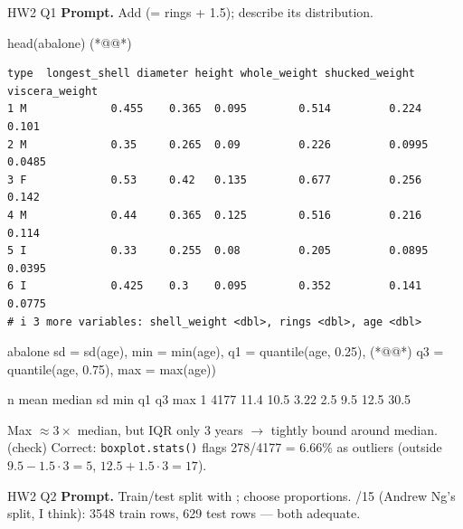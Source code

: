 \begin{qbox}{HW2 Q1}
\textbf{Prompt.} Add  (= rings + 1.5); describe its distribution.
\mine
\begin{rcode}
head(abalone)  (*@@*)
\end{rcode}
\begin{lstlisting}[style=cs/rout,basicstyle=\ttfamily\scriptsize]
  type  longest_shell diameter height whole_weight shucked_weight viscera_weight
1 M             0.455    0.365  0.095        0.514         0.224          0.101
2 M             0.35     0.265  0.09         0.226         0.0995         0.0485
3 F             0.53     0.42   0.135        0.677         0.256          0.142
4 M             0.44     0.365  0.125        0.516         0.216          0.114
5 I             0.33     0.255  0.08         0.205         0.0895         0.0395
6 I             0.425    0.3    0.095        0.352         0.141          0.0775
# i 3 more variables: shell_weight <dbl>, rings <dbl>, age <dbl>
\end{lstlisting}
\begin{rcode}
abalone %
  sd = sd(age), min = min(age), q1 = quantile(age, 0.25),  (*@@*)
  q3 = quantile(age, 0.75), max = max(age))
\end{rcode}
\begin{routput}
      n  mean median    sd   min    q1    q3   max
1  4177  11.4   10.5  3.22   2.5   9.5  12.5  30.5
\end{routput}
Max $\approx3\times$ median, but IQR only 3 years $\to$ tightly bound around median.
\ans (check) Correct: \texttt{boxplot.stats()} flags 278/4177 = 6.66\% as outliers (outside $9.5-1.5\cdot3=5$, $12.5+1.5\cdot3=17$).
\end{qbox}

\begin{qbox}{HW2 Q2}
\textbf{Prompt.} Train/test split with ; choose proportions.
/15 (Andrew Ng's split, I think): 3548 train rows, 629 test rows --- both adequate.
\end{qbox}

